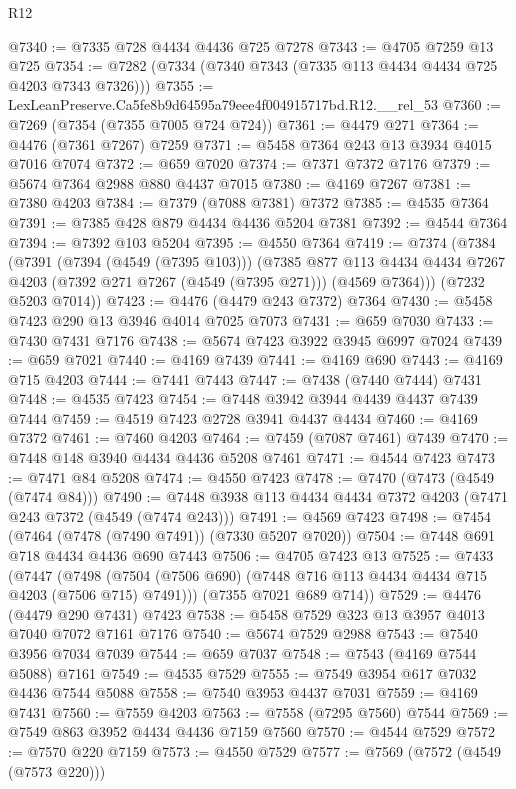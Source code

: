 \begin{lexlean}{R12}
\begin{coremodule}
@7340 := @7335 @728 @4434 @4436 @725 @7278
@7343 := @4705 @7259 @13 @725
@7354 := @7282 (@7334 (@7340 @7343 (@7335 @113 @4434 @4434 @725 @4203 @7343 @7326)))
@7355 := LexLeanPreserve.Ca5fe8b9d64595a79eee4f004915717bd.R12.__rel_53
@7360 := @7269 (@7354 (@7355 @7005 @724 @724))
@7361 := @4479 @271
@7364 := @4476 (@7361 @7267) @7259
@7371 := @5458 @7364 @243 @13 @3934 @4015 @7016 @7074
@7372 := @659 @7020
@7374 := @7371 @7372 @7176
@7379 := @5674 @7364 @2988 @880 @4437 @7015
@7380 := @4169 @7267
@7381 := @7380 @4203
@7384 := @7379 (@7088 @7381) @7372
@7385 := @4535 @7364
@7391 := @7385 @428 @879 @4434 @4436 @5204 @7381
@7392 := @4544 @7364
@7394 := @7392 @103 @5204
@7395 := @4550 @7364
@7419 := @7374
    (@7384
      (@7391
        (@7394 (@4549 (@7395 @103)))
        (@7385
          @877
          @113
          @4434
          @4434
          @7267
          @4203
          (@7392 @271 @7267 (@4549 (@7395 @271)))
          (@4569 @7364)))
      (@7232 @5203 @7014))
@7423 := @4476 (@4479 @243 @7372) @7364
@7430 := @5458 @7423 @290 @13 @3946 @4014 @7025 @7073
@7431 := @659 @7030
@7433 := @7430 @7431 @7176
@7438 := @5674 @7423 @3922 @3945 @6997 @7024
@7439 := @659 @7021
@7440 := @4169 @7439
@7441 := @4169 @690
@7443 := @4169 @715 @4203
@7444 := @7441 @7443
@7447 := @7438 (@7440 @7444) @7431
@7448 := @4535 @7423
@7454 := @7448 @3942 @3944 @4439 @4437 @7439 @7444
@7459 := @4519 @7423 @2728 @3941 @4437 @4434
@7460 := @4169 @7372
@7461 := @7460 @4203
@7464 := @7459 (@7087 @7461) @7439
@7470 := @7448 @148 @3940 @4434 @4436 @5208 @7461
@7471 := @4544 @7423
@7473 := @7471 @84 @5208
@7474 := @4550 @7423
@7478 := @7470 (@7473 (@4549 (@7474 @84)))
@7490 := @7448 @3938 @113 @4434 @4434 @7372 @4203 (@7471 @243 @7372 (@4549 (@7474 @243)))
@7491 := @4569 @7423
@7498 := @7454 (@7464 (@7478 (@7490 @7491)) (@7330 @5207 @7020))
@7504 := @7448 @691 @718 @4434 @4436 @690 @7443
@7506 := @4705 @7423 @13
@7525 := @7433
    (@7447
      (@7498 (@7504 (@7506 @690) (@7448 @716 @113 @4434 @4434 @715 @4203 (@7506 @715) @7491)))
      (@7355 @7021 @689 @714))
@7529 := @4476 (@4479 @290 @7431) @7423
@7538 := @5458 @7529 @323 @13 @3957 @4013 @7040 @7072 @7161 @7176
@7540 := @5674 @7529 @2988
@7543 := @7540 @3956 @7034 @7039
@7544 := @659 @7037
@7548 := @7543 (@4169 @7544 @5088) @7161
@7549 := @4535 @7529
@7555 := @7549 @3954 @617 @7032 @4436 @7544 @5088
@7558 := @7540 @3953 @4437 @7031
@7559 := @4169 @7431
@7560 := @7559 @4203
@7563 := @7558 (@7295 @7560) @7544
@7569 := @7549 @863 @3952 @4434 @4436 @7159 @7560
@7570 := @4544 @7529
@7572 := @7570 @220 @7159
@7573 := @4550 @7529
@7577 := @7569 (@7572 (@4549 (@7573 @220)))

\end{coremodule}
\end{lexlean}
